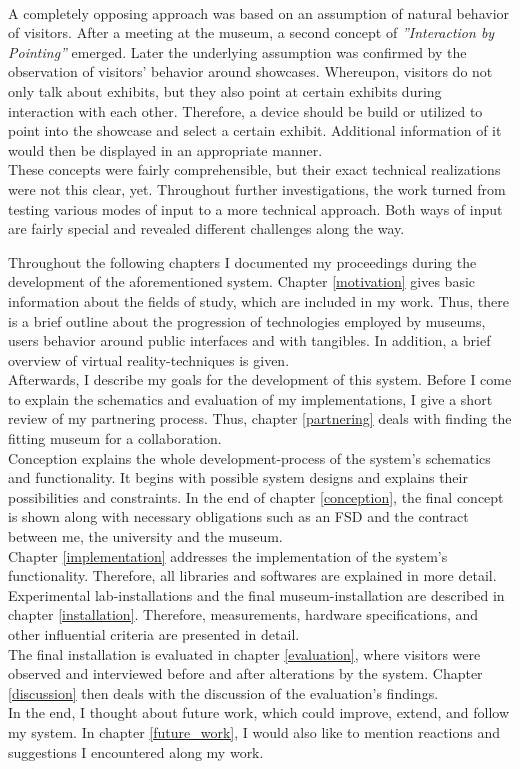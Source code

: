 \\
A completely opposing approach was based on an assumption of natural behavior of visitors. After a meeting at the museum, a second concept of \textit{''Interaction by Pointing''} emerged. Later the underlying assumption was confirmed by the observation of visitors' behavior around showcases. Whereupon, visitors do not only talk about exhibits, but they also point at certain exhibits during interaction with each other. Therefore, a device should be build or utilized to point into the showcase and select a certain exhibit. Additional information of it would then be displayed in an appropriate manner. 
\\
These concepts were fairly comprehensible, but their exact technical realizations were not this clear, yet. Throughout further investigations, the work turned from testing various modes of input to a more technical approach. Both ways of input are fairly special and revealed different challenges along the way.


Throughout the following chapters I documented my proceedings during the development of the aforementioned system. Chapter \ref{motivation} gives basic information about the fields of study, which are included in my work. Thus, there is a brief outline about the progression of technologies employed by museums, users behavior around public interfaces and with tangibles. In addition, a brief overview of virtual reality-techniques is given.
\\
Afterwards, I describe my goals for the development of this system. Before I come to explain the schematics and evaluation of my implementations, I give a short review of my partnering process. Thus, chapter \ref{partnering} deals with finding the fitting museum for a collaboration. 
\\
Conception explains the whole development-process of the system's schematics and functionality. It begins with possible system designs and explains their possibilities and constraints. In the end of chapter \ref{conception}, the final concept is shown along with necessary obligations such as an \ac{FSD} and the contract between me, the university and the museum.
\\
Chapter \ref{implementation} addresses the implementation of the system's functionality. Therefore, all libraries and softwares are explained in more detail.
\\
Experimental lab-installations and the final museum-installation are described in chapter \ref{installation}. Therefore, measurements, hardware specifications, and other influential criteria are presented in detail.
\\
The final installation is evaluated in chapter \ref{evaluation}, where visitors were observed and interviewed before and after alterations by the system. Chapter \ref{discussion} then deals with the discussion of the evaluation's findings.
\\
In the end, I thought about future work, which could improve, extend, and follow my system. In chapter \ref{future_work}, I would also like to mention reactions and suggestions I encountered along my work.

